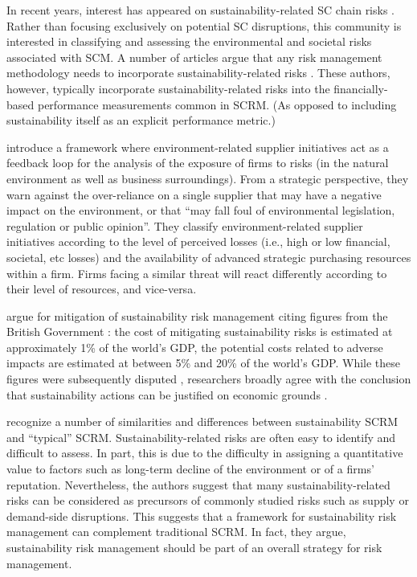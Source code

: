 \documentclass[a4paper]{article}
\begin{document}
In recent years, interest has appeared on sustainability-related SC chain risks \citep{Giannakis:2016}.
Rather than focusing exclusively on potential SC disruptions, this community is interested in classifying and assessing the environmental and societal risks associated with SCM. 
A number of articles argue that any risk management methodology needs to incorporate sustainability-related risks \citep{Cousins:2004, Teuscher:2006, Anderson:2006, Anderson:2009}. 
These authors, however, typically incorporate sustainability-related risks into the financially-based performance measurements common in SCRM. (As opposed to including sustainability itself as an explicit performance metric.)

\citet{Cousins:2004} introduce a framework where environment-related supplier initiatives act as a feedback loop for the analysis of the exposure of firms to risks (in the natural environment as well as business surroundings).
From a strategic perspective, they warn against the over-reliance on a single supplier that may have a negative impact on the environment, or that ``may fall foul of environmental legislation, regulation or public opinion''.
They classify environment-related supplier initiatives according to the level of perceived losses (i.e., high or low financial, societal, etc losses) and the availability of advanced strategic purchasing resources within a firm. 
Firms facing a similar threat will react differently according to their level of resources, and vice-versa. 

\citet{Anderson:2009} argue for mitigation of sustainability risk management citing figures from the British Government \citep{Stern:2007}: the cost of mitigating sustainability risks is estimated at approximately 1\% of the world's GDP, the potential costs related to adverse impacts are estimated at between 5\% and 20\% of the world's GDP. 
While these figures were subsequently disputed \citep{Weitzman:2007}, researchers broadly agree with the conclusion that sustainability actions can be justified on economic grounds \citep{Tol:2006}.

\citet{Giannakis:2016} recognize a number of similarities and differences between sustainability SCRM and ``typical'' SCRM. 
Sustainability-related risks are often easy to identify and difficult to assess. 
In part, this is due to the difficulty in assigning a quantitative value to factors such as long-term decline of the environment or of a firms' reputation. 
Nevertheless, the authors suggest that many sustainability-related risks can be considered as precursors of commonly studied risks such as supply or demand-side disruptions. 
This suggests that a framework for sustainability risk management can complement traditional SCRM.
In fact, they argue, sustainability risk management should be part of an overall strategy for risk management. 
\end{document}
